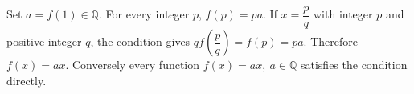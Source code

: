 Set $a=f(1)\in\mathbb Q$. For every integer $p$, $f(p)=pa$. If $x=\dfrac{p}{q}$ with integer $p$ and positive integer $q$, the condition gives $qf(\dfrac{p}{q})=f(p)=pa$. Therefore $f(x)=ax$. Conversely every function $\boxed{f(x)=ax,\ a\in\mathbb Q}$ satisfies the condition directly.
